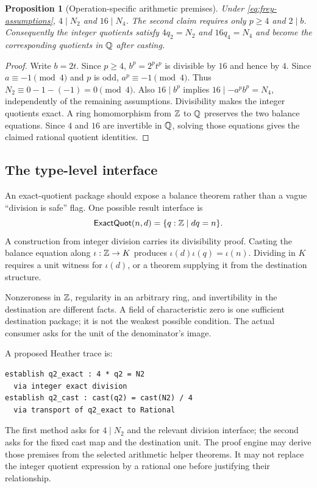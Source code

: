\documentclass[11pt,letterpaper]{article}
\newtheorem{proposition}[theorem]{Proposition}
\theoremstyle{definition}\newtheorem{definition}[theorem]{Definition}
\theoremstyle{remark}\newtheorem{remark}[theorem]{Remark}
\begin{document}
\begin{proposition}[Operation-specific arithmetic premises]
Under \eqref{eq:frey-assumptions}, $4\mid N_2$ and $16\mid N_4$. The second
claim requires only $p\ge4$ and $2\mid b$. Consequently the integer quotients
satisfy $4q_2=N_2$ and $16q_4=N_4$ and become the corresponding quotients in
$\mathbb Q$ after casting.
\end{proposition}
\begin{proof}
Write $b=2t$. Since $p\ge4$, $b^p=2^pt^p$ is divisible by $16$ and hence by
$4$. Since $a\equiv-1\pmod4$ and $p$ is odd, $a^p\equiv-1\pmod4$.
Thus $N_2\equiv0-1-(-1)=0\pmod4$. Also $16\mid b^p$ implies
$16\mid-a^pb^p=N_4$, independently of the remaining assumptions.
Divisibility makes the integer quotients exact. A ring homomorphism from
$\mathbb Z$ to $\mathbb Q$ preserves the two balance equations. Since $4$ and $16$ are
invertible in $\mathbb Q$, solving those equations gives the claimed rational
quotient identities.
\end{proof}

\subsection{The type-level interface}
An exact-quotient package should expose a balance theorem rather than a vague
``division is safe'' flag. One possible result interface is
\[
 \mathsf{ExactQuot}(n,d)=\{q:\mathbb Z\mid d q=n\}.
\]
A construction from integer division carries its divisibility proof. Casting
the balance equation along $\iota:\mathbb Z\to K$ produces
$\iota(d)\iota(q)=\iota(n)$. Dividing in $K$ requires a unit witness for
$\iota(d)$, or a theorem supplying it from the destination structure.

Nonzeroness in $\mathbb Z$, regularity in an arbitrary ring, and invertibility in the
destination are different facts. A field of characteristic zero is one
sufficient destination package; it is not the weakest possible condition.
The actual consumer asks for the unit of the denominator's image.

A proposed Heather trace is:
\par\noindent\begin{minipage}{\linewidth}
\begin{lstlisting}
establish q2_exact : 4 * q2 = N2
  via integer exact division
establish q2_cast : cast(q2) = cast(N2) / 4
  via transport of q2_exact to Rational
\end{lstlisting}
\end{minipage}\par
The first method asks for $4\mid N_2$ and the relevant division interface; the
second asks for the fixed cast map and the destination unit. The proof engine
may derive those premises from the selected arithmetic helper theorems.
It may not replace the integer quotient expression by a rational one before
justifying their relationship.
\end{document}
